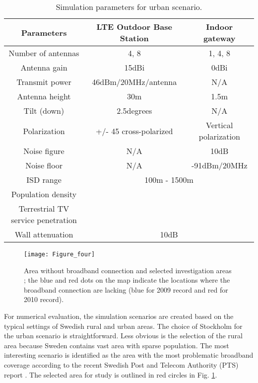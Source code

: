 \documentclass[journal]{IEEEtran}
\begin{document}
\begin{table*}
\caption{Simulation parameters for urban scenario.}\label{table:urban}
\centering
\begin{tabular}{|c|c|c|}
  \hline
Parameters&	LTE Outdoor Base Station&	Indoor gateway \\
\hline
Number of antennas	&4, 8	&1, 4, 8\\
Antenna gain	&15dBi	&0dBi \\
Transmit power	&46dBm/20MHz/antenna &N/A	\\
Antenna height	&30m	&1.5m\\
Tilt (down)	&2.5degrees&N/A \\
Polarization	&+/- 45 cross-polarized	&Vertical polarization\\
Noise figure	&N/A	&10dB\\
Noise floor	&N/A &-91dBm/20MHz	\\
\hline
ISD range	&\multicolumn{2}{c|}{100m - 1500m} \\
Population density 	&\multicolumn{2}{c|}{} \\
Terrestrial TV service penetration	&\multicolumn{2}{c|}{} \\
Wall attenuation  &\multicolumn{2}{c|}{10dB} \\
  \hline
\end{tabular}
\end{table*}

\begin{figure}[t]
  \centering
  \texttt{[image: Figure\_four]}\\
  \caption{Area without broadband connection and selected investigation areas \cite{PTS4}; the blue and red dots on the map indicate the locations where the broadband connection are lacking (blue for 2009 record and red for 2010 record).}\label{fig:Area}
\end{figure}

For numerical evaluation, the simulation scenarios are created based on the typical settings of Swedish rural and urban areas. The choice of Stockholm for the urban scenario is straightforward. Less obvious is the selection of the rural area because Sweden contains vast area with sparse population. The most interesting scenario is identified as the area with the most problematic broadband coverage according to the recent Swedish Post and Telecom Authority (PTS) report \cite{PTS4}. The selected area for study is outlined in red circles in Fig. \ref{fig:Area}.
\end{document}
